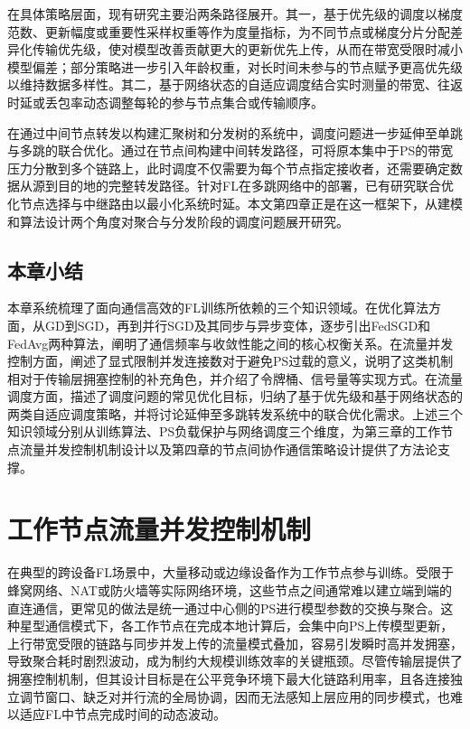 \documentclass[master, vlined]{DissertUESTC}
\begin{document}
	在具体策略层面，现有研究主要沿两条路径展开。其一，基于优先级的调度以梯度范数、更新幅度或重要性采样权重等作为度量指标，为不同节点或梯度分片分配差异化传输优先级，使对模型改善贡献更大的更新优先上传，从而在带宽受限时减小模型偏差；部分策略进一步引入年龄权重，对长时间未参与的节点赋予更高优先级以维持数据多样性。其二，基于网络状态的自适应调度结合实时测量的带宽、往返时延或丢包率动态调整每轮的参与节点集合或传输顺序。

	在通过中间节点转发以构建汇聚树和分发树的系统中，调度问题进一步延伸至单跳与多跳的联合优化。通过在节点间构建中间转发路径，可将原本集中于PS的带宽压力分散到多个链路上，此时调度不仅需要为每个节点指定接收者，还需要确定数据从源到目的地的完整转发路径。针对FL在多跳网络中的部署，已有研究联合优化节点选择与中继路由以最小化系统时延。本文第四章正是在这一框架下，从建模和算法设计两个角度对聚合与分发阶段的调度问题展开研究。

	\section{本章小结}
	\label{sec:chap2-summary}

	本章系统梳理了面向通信高效的FL训练所依赖的三个知识领域。在优化算法方面，从GD到SGD，再到并行SGD及其同步与异步变体，逐步引出FedSGD和FedAvg两种算法，阐明了通信频率与收敛性能之间的核心权衡关系。在流量并发控制方面，阐述了显式限制并发连接数对于避免PS过载的意义，说明了这类机制相对于传输层拥塞控制的补充角色，并介绍了令牌桶、信号量等实现方式。在流量调度方面，描述了调度问题的常见优化目标，归纳了基于优先级和基于网络状态的两类自适应调度策略，并将讨论延伸至多跳转发系统中的联合优化需求。上述三个知识领域分别从训练算法、PS负载保护与网络调度三个维度，为第三章的工作节点流量并发控制机制设计以及第四章的节点间协作通信策略设计提供了方法论支撑。

	\chapter{工作节点流量并发控制机制}

	在典型的跨设备FL场景中，大量移动或边缘设备作为工作节点参与训练。受限于蜂窝网络、NAT或防火墙等实际网络环境，这些节点之间通常难以建立端到端的直连通信，更常见的做法是统一通过中心侧的PS进行模型参数的交换与聚合。这种星型通信模式下，各工作节点在完成本地计算后，会集中向PS上传模型更新，上行带宽受限的链路与同步并发上传的流量模式叠加，容易引发瞬时高并发拥塞，导致聚合耗时剧烈波动，成为制约大规模训练效率的关键瓶颈。尽管传输层提供了拥塞控制机制，但其设计目标是在公平竞争环境下最大化链路利用率，且各连接独立调节窗口、缺乏对并行流的全局协调，因而无法感知上层应用的同步模式，也难以适应FL中节点完成时间的动态波动。
\end{document}
